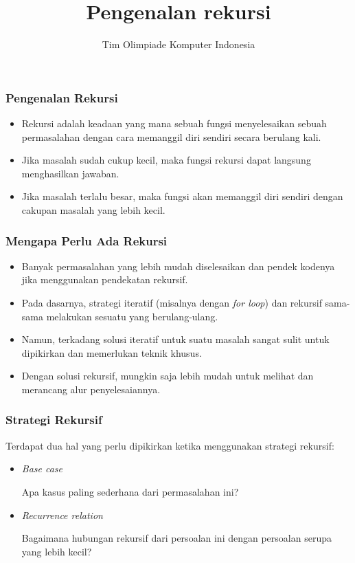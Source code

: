 

\title{Pengenalan rekursi}
\author{Tim Olimpiade Komputer Indonesia}
\date{}



\begin{frame}
\titlepage
\end{frame}

\begin{frame}
\frametitle{Pengenalan Rekursi}
\begin{itemize}
  \item Rekursi adalah keadaan yang mana sebuah fungsi menyelesaikan sebuah permasalahan dengan cara memanggil diri sendiri secara berulang kali.
  \item Jika masalah sudah cukup kecil, maka fungsi rekursi dapat langsung menghasilkan jawaban.
  \item Jika masalah terlalu besar, maka fungsi akan memanggil diri sendiri dengan cakupan masalah yang lebih kecil.
\end{itemize}
\end{frame}

\begin{frame}
\frametitle{Mengapa Perlu Ada Rekursi}
\begin{itemize}
  \item Banyak permasalahan yang lebih mudah diselesaikan dan pendek kodenya jika menggunakan pendekatan rekursif.
  \item Pada dasarnya, strategi iteratif (misalnya dengan \textit{for loop}) dan rekursif sama-sama melakukan sesuatu yang berulang-ulang. 
  \item Namun, terkadang solusi iteratif  untuk suatu masalah sangat sulit untuk dipikirkan dan memerlukan teknik khusus.
  \item Dengan solusi rekursif, mungkin saja lebih mudah untuk melihat dan merancang alur penyelesaiannya.
\end{itemize}
\end{frame}

\begin{frame}
\frametitle{Strategi Rekursif}
Terdapat dua hal yang perlu dipikirkan ketika menggunakan strategi rekursif:
\begin{itemize}
  \item \textit{Base case}
  
  Apa kasus paling sederhana dari permasalahan ini?
  
  \item \textit{Recurrence relation}
  
  Bagaimana hubungan rekursif dari persoalan ini dengan persoalan serupa yang lebih kecil?
\end{itemize}
\end{frame}

